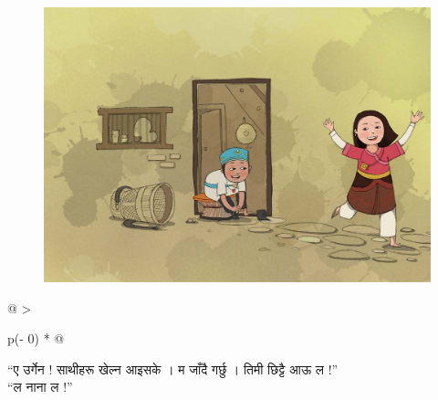 \documentclass[
  letterpaper,
  DIV=11,
  numbers=noendperiod,
  paper=6in:9in,
  pagesize=pdftex,
  headinclude=on,
  footinclude=on,
  12pt]{scrreprt}
\begin{document}
\hypertarget{img}{}
\begin{figure}[H]

{\centering \includegraphics{images/p-2.jpg}

}

\end{figure}

\hypertarget{p}{}
\begin{longtable}[]{@{}
  >{\raggedright\arraybackslash}p{(\columnwidth - 0\tabcolsep) * }@{}}
\toprule\noalign{}
\endhead
\bottomrule\noalign{}
\endlastfoot
\begin{minipage}[t]{\linewidth}\raggedright
``ए उर्गेन ! साथीहरू खेल्न आइसके । म जाँदै गर्छु । तिमी छिट्टै आऊ ल !''\\
``ल नाना ल !''\strut
\end{minipage} \\
\end{longtable}


\hypertarget{section-1}{%
\chapter{}\label{section-1}}
\end{document}
